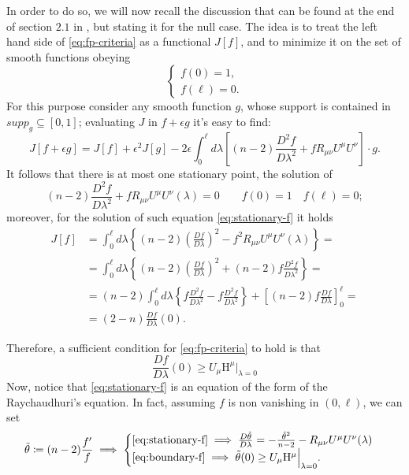 	In order to do so, we will now recall the discussion that can be found at the end of section \(2.1\) in \cite{fewster2020new}, but stating it for the null case.
	The idea is to treat the left hand side of \ref{eq:fp-criteria} as a functional \(J[f]\), and to minimize it on the set of smooth functions obeying 
	\[
	\begin{cases}
	f(0) = 1, \\
	f(\ell) = 0.
	\end{cases}
	\]
	For this purpose consider any smooth function \(g\), whose support is contained in \(supp_g \subseteq [0,1]\); evaluating \(J\) in \(f + \epsilon g\) it's easy to find:
	\[
	J[f + \epsilon g] = J[f] + \epsilon^2J[g] - 2\epsilon\int_{0}^{\ell} d\lambda \left[(n - 2) \frac{D^2f}{D\lambda^2} + fR_{\mu\nu}U^{\mu}U^{\nu}\right] \cdot g.
	\]
	It follows that there is at most one stationary point, the solution of
	\begin{equation}
	\label{eq:stationary-f}
		(n - 2) \frac{D^2f}{D\lambda^2} + fR_{\mu\nu}U^{\mu}U^{\nu}(\lambda) = 0 \quad \quad f(0) = 1 \quad f(\ell) = 0;
	\end{equation}
	moreover, for the solution of such equation \eqref{eq:stationary-f} it holds
	\begin{align*}
	J[f] &= \int_{0}^{\ell} d\lambda \left\lbrace (n - 2) \left(\frac{Df}{D\lambda}\right)^2 -f^2R_{\mu\nu}U^{\mu}U^{\nu}(\lambda) \right\rbrace= \\
%	
	&= \int_{0}^{\ell} d\lambda \left\lbrace (n - 2) \left(\frac{Df}{D\lambda}\right)^2 +(n - 2)f\frac{D^2f}{D\lambda^2}  \right\rbrace =\\
%	
	&= (n - 2) \int_{0}^{\ell} d\lambda \left\lbrace f\frac{D^2f}{D\lambda^2} - f\frac{D^2f}{D\lambda^2} \right\rbrace + \left[(n - 2) f\frac{Df}{D\lambda} \right]_0^{\ell} =\\
%	
	&= (2 - n)\frac{Df}{D\lambda}(0).	
	\end{align*}
	
	Therefore, a sufficient condition for \eqref{eq:fp-criteria} to hold is that
	\begin{equation}
		\label{eq:boundary-f}
		\frac{Df}{D\lambda}(0) \ge U_{\mu}\mathrm{H}^{\mu}\Big\vert_{\lambda = 0}
	\end{equation}
	Now, notice that \eqref{eq:stationary-f} is an equation of the form of the Raychaudhuri's equation. In fact, assuming \(f\) is non vanishing in \((0, \ell)\), we can set 
	\[
	\tilde{\theta}\coloneqq (n - 2) \frac{f'}{f} \implies
	\begin{cases}
	\eqref{eq:stationary-f} \implies \frac{D\tilde{\theta}}{D\lambda} = -\frac{\tilde{\theta}^2}{n - 2} - R_{\mu\nu}U^{\mu}U^{\nu}(\lambda) \\
	\eqref{eq:boundary-f} \implies \tilde{\theta}(0) \ge U_{\mu}\mathrm{H}^{\mu}\Big\vert_{\lambda = 0}.
	\end{cases}	
	\]
	
